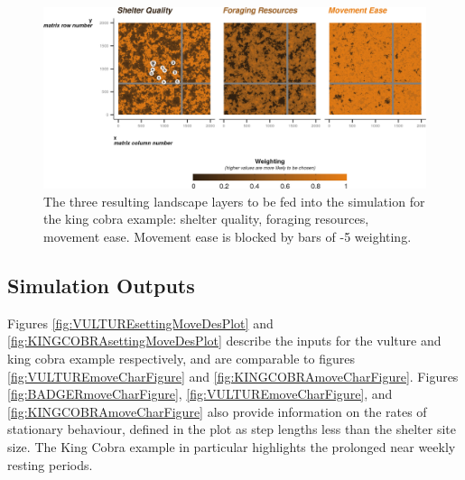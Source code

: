 \documentclass[10pt,a4paper]{article}
\begin{document}
\begin{figure}

{\centering \includegraphics{Agent-based_model_walkthrough_files/figure-latex/KINGCOBRAlayersFigure-1} 

}

\caption{The three resulting landscape layers to be fed into the simulation for the king cobra example: shelter quality, foraging resources, movement ease. Movement ease is blocked by bars of -5 weighting.}\label{fig:KINGCOBRAlayersFigure}
\end{figure}

\clearpage

\hypertarget{simulation-outputs}{%
\subsection{Simulation Outputs}\label{simulation-outputs}}

Figures \ref{fig:VULTUREsettingMoveDesPlot} and \ref{fig:KINGCOBRAsettingMoveDesPlot} describe the inputs for the vulture and king cobra example respectively, and are comparable to figures \ref{fig:VULTUREmoveCharFigure} and \ref{fig:KINGCOBRAmoveCharFigure}.
Figures \ref{fig:BADGERmoveCharFigure}, \ref{fig:VULTUREmoveCharFigure}, and \ref{fig:KINGCOBRAmoveCharFigure} also provide information on the rates of stationary behaviour, defined in the plot as step lengths less than the shelter site size.
The King Cobra example in particular highlights the prolonged near weekly resting periods.
\end{document}
